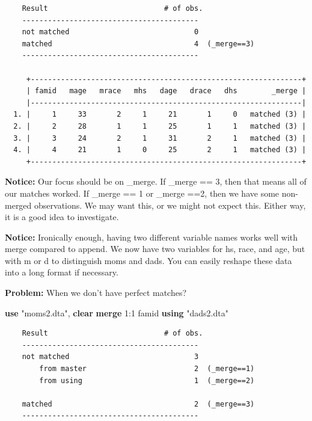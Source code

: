\documentclass[
]{book}
\newenvironment{Shaded}{\begin{snugshade}}{\end{snugshade}}
\newcommand{\KeywordTok}[1]{\textcolor[rgb]{0.13,0.29,0.53}{\textbf{#1}}}
\newcommand{\NormalTok}[1]{#1}
\newcommand{\StringTok}[1]{\textcolor[rgb]{0.31,0.60,0.02}{#1}}
\begin{document}
\begin{verbatim}
    Result                           # of obs.
    -----------------------------------------
    not matched                             0
    matched                                 4  (_merge==3)
    -----------------------------------------

     +---------------------------------------------------------------+
     | famid   mage   mrace   mhs   dage   drace   dhs        _merge |
     |---------------------------------------------------------------|
  1. |     1     33       2     1     21       1     0   matched (3) |
  2. |     2     28       1     1     25       1     1   matched (3) |
  3. |     3     24       2     1     31       2     1   matched (3) |
  4. |     4     21       1     0     25       2     1   matched (3) |
     +---------------------------------------------------------------+
\end{verbatim}

\textbf{Notice:} Our focus should be on \_merge. If \_merge == 3, then that means all of our
matches worked. If \_merge == 1 or \_merge ==2, then we have some non-merged observations. We may want this, or we might not expect this. Either way, it is a good idea to investigate.

\textbf{Notice:} Ironically enough, having two different variable names works well with merge
compared to append. We now have two variables for hs, race, and age, but with m or d to distinguish moms and dads. You can easily reshape these data into a long format if necessary.

\textbf{Problem:} When we don't have perfect matches?

\begin{Shaded}
\begin{Highlighting}[]
\KeywordTok{use} \StringTok{"moms2.dta"}\NormalTok{, }\KeywordTok{clear}
\KeywordTok{merge}\NormalTok{ 1:1 famid }\KeywordTok{using} \StringTok{"dads2.dta"}
\end{Highlighting}
\end{Shaded}

\begin{verbatim}
    Result                           # of obs.
    -----------------------------------------
    not matched                             3
        from master                         2  (_merge==1)
        from using                          1  (_merge==2)

    matched                                 2  (_merge==3)
    -----------------------------------------
\end{verbatim}
\end{document}
